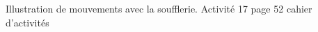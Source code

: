 \begin{myact}{}
	Illustration de mouvements avec la soufflerie.
	Activité 17 page 52 cahier d'activités
\end{myact}